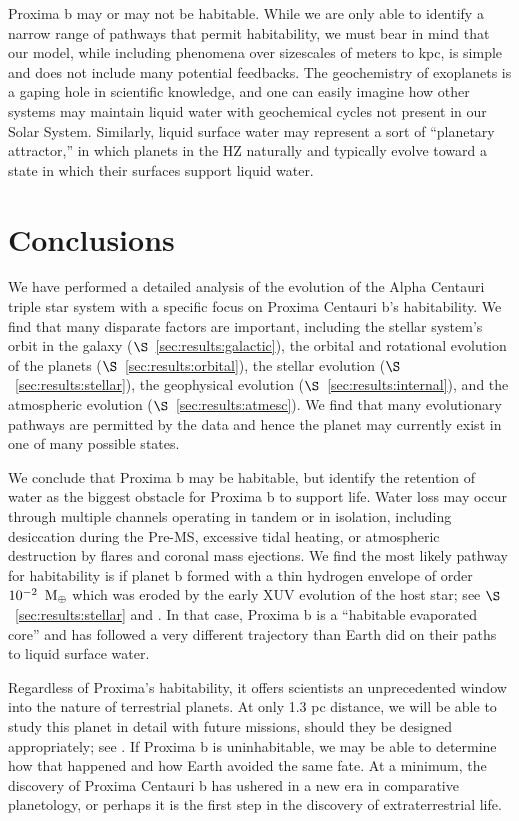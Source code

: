 \documentclass[preprint,12pt]{aastex}
\def\mearth{{\rm\,M_\oplus}}
\begin{document}
Proxima b may or may not be habitable. While we are only able to
identify a narrow range of pathways that permit habitability, we must
bear in mind that our model, while including phenomena over sizescales
of meters to kpc, is simple and does not include many potential
feedbacks. The geochemistry of exoplanets is a gaping hole in
scientific knowledge, and one can easily imagine how other systems may
maintain liquid water with geochemical cycles not present in our Solar
System. Similarly, liquid surface water may represent a sort of
``planetary attractor,'' in which planets in the HZ naturally and
typically evolve toward a state in which their surfaces support liquid
water.

\section{Conclusions\label{sec:concl}}
We have performed a detailed analysis of the evolution of the
Alpha Centauri triple star system with a specific focus on Proxima
Centauri b's habitability. We find that many disparate factors are
important, including the stellar system's orbit in the galaxy
($\S$~\ref{sec:results:galactic}), the orbital and rotational
evolution of the planets ($\S$~\ref{sec:results:orbital}), the stellar
evolution ($\S$~\ref{sec:results:stellar}), the geophysical evolution
($\S$~\ref{sec:results:internal}), and the atmospheric evolution
($\S$~\ref{sec:results:atmesc}). We find that many evolutionary
pathways are permitted by the data and hence the planet may currently
exist in one of many possible states.

We conclude that Proxima b may be habitable, but identify the
retention of water as the biggest obstacle for Proxima b to support
life. Water loss may occur through multiple channels operating in
tandem or in isolation, including desiccation during the Pre-MS,
excessive tidal heating, or atmospheric destruction by flares and
coronal mass ejections. We find the most likely pathway for
habitability is if planet b formed with a thin hydrogen envelope of
order $10^{-2}~\mearth$ which was eroded by the early XUV evolution of
the host star; see $\S$~\ref{sec:results:stellar} and
\cite{Luger15}. In that case, Proxima b is a ``habitable evaporated
core'' and has followed a very different trajectory than Earth did on
their paths to liquid surface water.

Regardless of Proxima's habitability, it offers scientists an
unprecedented window into the nature of terrestrial planets. At only
1.3 pc distance, we will be able to study this planet in detail with
future missions, should they be designed appropriately; see
\cite{Meadows16}. If Proxima b is uninhabitable, we may be able to
determine how that happened and how Earth avoided the same fate. At a
minimum, the discovery of Proxima Centauri b has ushered in a new era
in comparative planetology, or perhaps it is the first step in the
discovery of extraterrestrial life.
 
\end{document}

